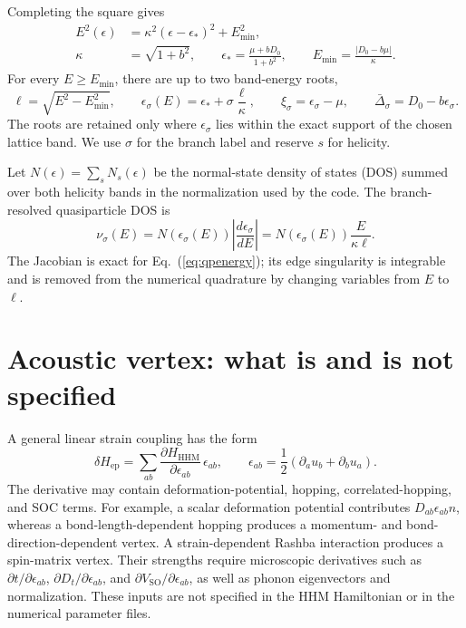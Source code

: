 \documentclass[aps,prb,preprint,superscriptaddress]{revtex4-2}
\newcommand{\Dbar}{\bar\Delta}
\newcommand{\Emin}{E_{\min}}
\begin{document}
Completing the square gives
\begin{align}
 E^2(\epsilon)&=\kappa^2(\epsilon-\epsilon_*)^2+\Emin^2,\\
 \kappa&=\sqrt{1+b^2},\qquad
 \epsilon_* = \frac{\mu+bD_0}{1+b^2},\qquad
 \Emin=\frac{|D_0-b\mu|}{\kappa}.
 \label{eq:complete-square}
\end{align}
For every $E\geq\Emin$, there are up to two band-energy roots,
\begin{equation}
 \ell=\sqrt{E^2-\Emin^2},\qquad
 \epsilon_\sigma(E)=\epsilon_*+\sigma\frac{\ell}{\kappa},\qquad
 \xi_\sigma=\epsilon_\sigma-\mu,\qquad
 \Dbar_\sigma=D_0-b\epsilon_\sigma.
 \label{eq:branches}
\end{equation}
The roots are retained only where $\epsilon_\sigma$ lies within the exact support of the chosen lattice band. We use $\sigma$ for the branch label and reserve $s$ for helicity.

Let $N(\epsilon)=\sum_sN_s(\epsilon)$ be the normal-state density of states (DOS) summed over both helicity bands in the normalization used by the code. The branch-resolved quasiparticle DOS is
\begin{equation}
 \nu_\sigma(E)=N\!\left(\epsilon_\sigma(E)\right)
 \left|\frac{d\epsilon_\sigma}{dE}\right|
 =N\!\left(\epsilon_\sigma(E)\right)\frac{E}{\kappa\ell}.
 \label{eq:qpDOS}
\end{equation}
The Jacobian is exact for Eq.~(\ref{eq:qpenergy}); its edge singularity is integrable and is removed from the numerical quadrature by changing variables from $E$ to $\ell$.

\section{Acoustic vertex: what is and is not specified}

A general linear strain coupling has the form
\begin{equation}
 \delta H_{\mathrm{ep}}=\sum_{ab}\frac{\partial H_{\mathrm{HHM}}}{\partial\epsilon_{ab}}\,\epsilon_{ab},\qquad
 \epsilon_{ab}=\frac12(\partial_a u_b+\partial_b u_a).
 \label{eq:strain}
\end{equation}
The derivative may contain deformation-potential, hopping, correlated-hopping, and SOC terms. For example, a scalar deformation potential contributes $D_{ab}\epsilon_{ab}n$, whereas a bond-length-dependent hopping produces a momentum- and bond-direction-dependent vertex. A strain-dependent Rashba interaction produces a spin-matrix vertex. Their strengths require microscopic derivatives such as $\partial t/\partial\epsilon_{ab}$, $\partial D_t/\partial\epsilon_{ab}$, and $\partial V_{\mathrm{SO}}/\partial\epsilon_{ab}$, as well as phonon eigenvectors and normalization. These inputs are not specified in the HHM Hamiltonian or in the numerical parameter files.
\end{document}
